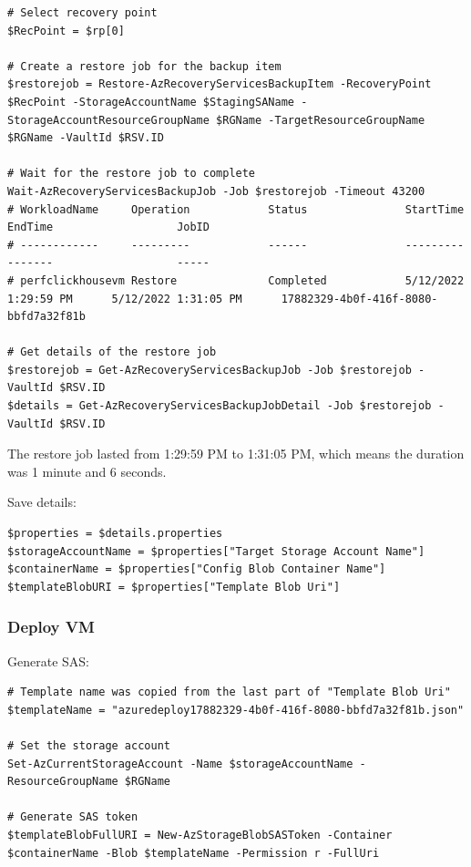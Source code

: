 \begin{verbatim}
# Select recovery point
$RecPoint = $rp[0]

# Create a restore job for the backup item
$restorejob = Restore-AzRecoveryServicesBackupItem -RecoveryPoint $RecPoint -StorageAccountName $StagingSAName -StorageAccountResourceGroupName $RGName -TargetResourceGroupName $RGName -VaultId $RSV.ID

# Wait for the restore job to complete
Wait-AzRecoveryServicesBackupJob -Job $restorejob -Timeout 43200
# WorkloadName     Operation            Status               StartTime                 EndTime                   JobID
# ------------     ---------            ------               ---------                 -------                   -----
# perfclickhousevm Restore              Completed            5/12/2022 1:29:59 PM      5/12/2022 1:31:05 PM      17882329-4b0f-416f-8080-bbfd7a32f81b

# Get details of the restore job
$restorejob = Get-AzRecoveryServicesBackupJob -Job $restorejob -VaultId $RSV.ID
$details = Get-AzRecoveryServicesBackupJobDetail -Job $restorejob -VaultId $RSV.ID
\end{verbatim}

The restore job lasted from 1:29:59 PM to 1:31:05 PM,
which means the duration was 1 minute and 6 seconds.

Save details:
\begin{verbatim}
$properties = $details.properties
$storageAccountName = $properties["Target Storage Account Name"]
$containerName = $properties["Config Blob Container Name"]
$templateBlobURI = $properties["Template Blob Uri"]
\end{verbatim}

\subsubsection{Deploy VM}
\label{sec:orgf121154}
Generate SAS:
\begin{verbatim}
# Template name was copied from the last part of "Template Blob Uri"
$templateName = "azuredeploy17882329-4b0f-416f-8080-bbfd7a32f81b.json"

# Set the storage account
Set-AzCurrentStorageAccount -Name $storageAccountName -ResourceGroupName $RGName

# Generate SAS token
$templateBlobFullURI = New-AzStorageBlobSASToken -Container $containerName -Blob $templateName -Permission r -FullUri
\end{verbatim}

